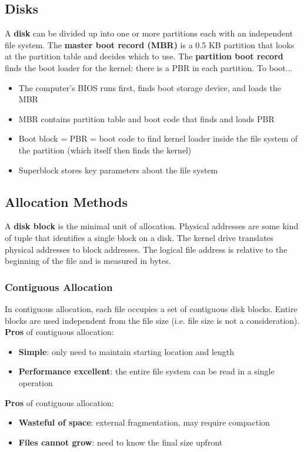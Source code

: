 \documentclass{article}
\newcommand{\bold}[1]{\textbf{#1}}
\renewcommand{\b}{\item[$\circ$]}
\newcommand{\newlist}{\begin{itemize}}
\renewcommand{\endlist}{\end{itemize}}
\begin{document}
\subsection{Disks}

A \bold{disk} can be divided up into one or more partitions each with an independent file system. The \bold{master boot record (MBR)} is a 0.5 KB partition that looks at the partition table and decides which to use. The \bold{partition boot record} finds the boot loader for the kernel: there is a PBR in each partition. To boot...

\newlist 
\b The computer's BIOS runs first, finds boot storage device, and loads the MBR
\b MBR contains partition table and boot code that finds and loads PBR
\b Boot block = PBR = boot code to find kernel loader inside the file system of the partition (which itself then finds the kernel) 
\b Superblock stores key parameters about the file system
\endlist 

\subsection{Allocation Methods}

A \bold{disk block} is the minimal unit of allocation. Physical addresses are some kind of tuple that identifies a single block on a disk. The kernel drive translates physical addresses to block addresses. The logical file address is relative to the beginning of the file and is measured in bytes. 

\subsubsection{Contiguous Allocation}

In contiguous allocation, each file occupies a set of contiguous disk blocks. Entire blocks are used independent from the file size (i.e. file size is not a consideration). \\ 

\bold{Pros} of contiguous allocation:

\newlist 
\b \bold{Simple}: only need to maintain starting location and length
\b \bold{Performance excellent}: the entire file system can be read in a single operation
\endlist 

\bold{Pros} of contiguous allocation:

\newlist 
\b \bold{Wasteful of space}: external fragmentation, may require compaction
\b \bold{Files cannot grow}: need to know the final size upfront
\endlist 
\end{document}

